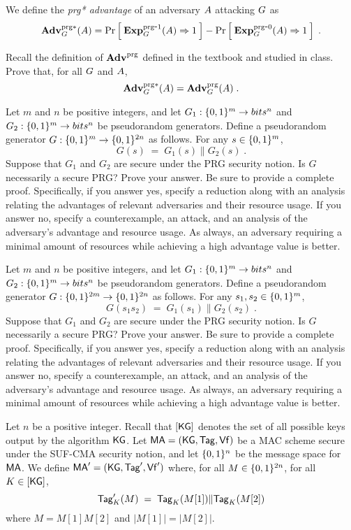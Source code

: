 \documentclass{exam}
\begin{document}
\begin{questions}
{{      \bigskip
      \noindent We define the \textit{prg* advantage} of an
      adversary $A$ attacking $G$ as
      \[
      \mathbf{Adv}^{\mathrm{prg*}}_{G}(A) = \Pr\left[\: \mathbf{Exp}^{\mathrm{prg}\mbox{-}1}_{G}(A) \Rightarrow 1 \:\right] -  \Pr\left[\: \mathbf{Exp}^{\mathrm{prg}\mbox{-}0}_{G}(A) \Rightarrow 1 \:\right]  \;.
      \]
    }
  }

  Recall the definition of $\mathbf{Adv}^{\mathrm{prg}}$ defined in the textbook and studied in class. Prove that, for all $G$ and $A$, 
  \[ \mathbf{Adv}^{\mathrm{prg*}}_{G}(A) = \mathbf{Adv}^{\mathrm{prg}}_{G}(A)\;. \]


  \question Let $m$ and $n$ be positive integers, and let $G_1:\{0,1\}^m \rightarrow bits^n$ and $G_2:\{0,1\}^m \rightarrow bits^n$ be pseudorandom generators. Define a pseudorandom generator $G: \{0,1\}^m \rightarrow \{0,1\}^{2n}$ as follows. For any $s \in \{0,1\}^m$,
  \[ G(s) \;=\; G_1(s) \| G_2(s)\;. \]
  Suppose that $G_1$ and $G_2$ are secure under the PRG security notion. Is $G$ necessarily a secure PRG? Prove your answer. Be sure to provide a complete proof. Specifically, if you answer yes, specify a reduction along with an analysis relating the advantages of relevant adversaries and their resource usage. If you answer no, specify a counterexample, an attack, and an analysis of the adversary's advantage and resource usage. As always, an adversary requiring a minimal amount of resources while achieving a high advantage value is better.

  \question Let $m$ and $n$ be positive integers, and let $G_1:\{0,1\}^m \rightarrow bits^n$ and $G_2:\{0,1\}^m \rightarrow bits^n$ be pseudorandom generators. Define a pseudorandom generator $G: \{0,1\}^{2m} \rightarrow \{0,1\}^{2n}$ as follows. For any $s_1,s_2 \in \{0,1\}^m$,
  \[ G(s_1s_2) \;=\; G_1(s_1) \| G_2(s_2)\;. \]
  Suppose that $G_1$ and $G_2$ are secure under the PRG security notion. Is $G$ necessarily a secure PRG? Prove your answer. Be sure to provide a complete proof. Specifically, if you answer yes, specify a reduction along with an analysis relating the advantages of relevant adversaries and their resource usage. If you answer no, specify a counterexample, an attack, and an analysis of the adversary's advantage and resource usage. As always, an adversary requiring a minimal amount of resources while achieving a high advantage value is better.


  \question Let $n$ be a positive integer. Recall that $[\mathsf{KG}]$ denotes the set of all possible keys output by the algorithm $\mathsf{KG}$. Let $\mathsf{MA} = (\mathsf{KG},\mathsf{Tag},\mathsf{Vf})$ be a MAC scheme secure under the SUF-CMA security notion, and let $\{0,1\}^n$ be the message space for $\mathsf{MA}$. We define $\mathsf{MA}' = (\mathsf{KG},\mathsf{Tag}',\mathsf{Vf}')$ where, for all $M \in \{0,1\}^{2n}$, for all $K \in [\mathsf{KG}]$,
  \[ \mathsf{Tag}'_K(M)  \;=\;  \mathsf{Tag}_K( M[1]) \| \mathsf{Tag}_K( M[2] )  \]
  where $M = M[1]M[2]$ and $|M[1]| = |M[2]|$.
  \begin{parts}

\end{parts}
\end{questions}
\end{document}
